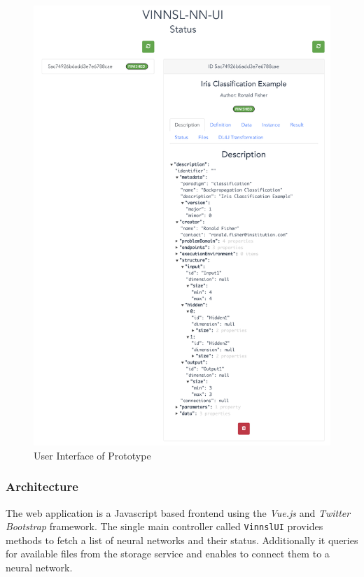 \begin{figure}
\centering
\includegraphics[width=15.00000cm]{images/VINNSL-NN-UI}
\caption{User Interface of Prototype \label{img.vinnsl-nn-ui}}
\end{figure}

\subsubsection{Architecture}\label{architecture}

The web application is a Javascript based frontend using the
\emph{Vue.js} and \emph{Twitter Bootstrap} framework. The single main
controller called \texttt{VinnslUI} provides methods to fetch a list of
neural networks and their status. Additionally it queries for available
files from the storage service and enables to connect them to a neural
network.

